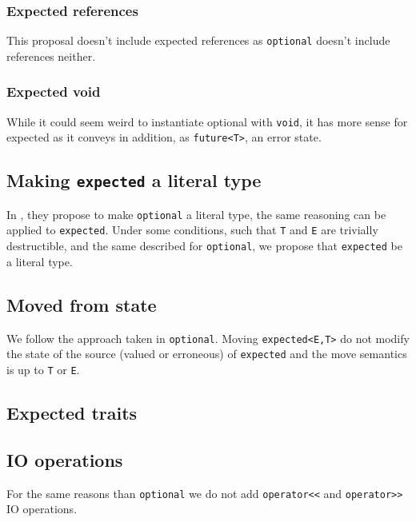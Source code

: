 \documentclass[a4paper,10pt]{article}
\newcommand{\cpp}[1]{\lstinline{#1}}
\begin{document}
\subsubsection{Expected references}

This proposal doesn't include expected references as \cpp{optional}\cite{OptionalRev5} doesn't include references neither.

\subsubsection{Expected void}

While it could seem weird to instantiate optional with \cpp{void}, it has more sense for expected as it conveys in addition, as \cpp{future<T>}, an error state.

\subsection{Making \cpp{expected} a literal type}

In \cite{OptionalRev4}, they propose to make \cpp{optional} a literal type, the same reasoning can be applied to \cpp{expected}. Under some conditions, such that \cpp{T} and \cpp{E} are trivially destructible, and the same described for \cpp{optional}, we propose that \cpp{expected} be a literal type.

\subsection{Moved from state}

We follow the approach taken in \cpp{optional}\cite{OptionalRev4}. Moving \cpp{expected<E,T>} do not modify the state of the source (valued or erroneous) of \cpp{expected} and the move semantics is up to \cpp{T} or \cpp{E}.

\subsection{Expected traits}
\label{expected-traits-rational}

\subsection{IO operations}

For the same reasons than \cpp{optional}\cite{OptionalRev4} we do not add \cpp{operator<<} and \cpp{operator>>} IO operations.
\end{document}
